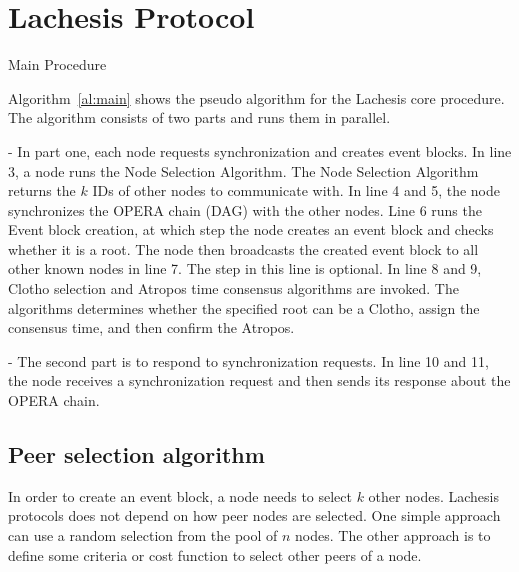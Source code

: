 \documentclass{article}
\makeatletter
\def\BState{\State\hskip-\ALG@thistlm}
\makeatother
\begin{document}
\section{Lachesis Protocol}\label{se:lca}

\begin{algorithm}[h]
\caption{Main Procedure}\label{al:main}
\end{algorithm}

Algorithm~\ref{al:main} shows the pseudo algorithm for the Lachesis core procedure. The algorithm consists of two parts and runs them in parallel.

- In part one, each node requests synchronization and creates event blocks. In line 3, a node runs the Node Selection Algorithm. The Node Selection Algorithm returns the $k$ IDs of other nodes to communicate with. In line 4 and 5, the node synchronizes the OPERA chain (DAG) with the other nodes. Line 6 runs the Event block creation, at which step the node creates an event block and checks whether it is a root. The node then broadcasts the created event block to all other known nodes in line 7. The step in this line is optional. In line 8 and 9, Clotho selection and Atropos time consensus algorithms are invoked. The algorithms determines whether the specified root can be a Clotho, assign the consensus time, and then confirm the Atropos. 

- The second part is to respond to synchronization requests. In line 10 and 11, the node receives a synchronization request and then sends its response about the OPERA chain.

\subsection{Peer selection algorithm}
In order to create an event block, a node needs to select $k$ other nodes. Lachesis protocols does not depend on how peer nodes are selected. One simple approach can use a random selection from the pool of $n$ nodes. The other approach is to define some criteria or cost function to select other peers of a node. 
\end{document}
